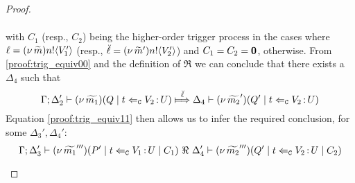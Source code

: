 \begin{proof}
\begin{enumerate}[1.]
\begin{enumerate}
\begin{eqnarray}
							\label{proof:trig_equiv11}
						\end{eqnarray}
							with $C_1$ (resp., $C_2$) being the higher-order trigger process
							in the cases where $\ell = (\nu\, \widetilde{m}) n ! \langle V_1' \rangle$ (resp., $\breve{\ell} = (\nu\, \widetilde{m}') n ! \langle V_2' \rangle$)
							and $C_1 = C_2 = \mathbf{0}$, otherwise.
							From \eqref{proof:trig_equiv00} and the definition of $\Re$
							we can conclude that there exists a $ \Delta_4$ such that
						\[
							\horel{\Gamma}{\Delta_2'}{\newsp{\widetilde{m_1}}{Q \Par \ftrigger{t}{V_2}{U}}}
							{\Hby{\mact{\ell}}}
							{\Delta_4}{\newsp{\widetilde{m_2}'}{Q' \Par \ftrigger{t}{V_2}{U}}}
						\]
							Equation \eqref{proof:trig_equiv11} then allows us to infer the required conclusion, for some $\Delta_3', \Delta_4'$:
						\[
							\Gamma; \Delta_3' \vdash (\nu\, \widetilde{m_1}''')(P' \;|\; t \Leftarrow_{\mathtt{C}} V_1{\,:\,}U \;|\; C_1) \ \Re\  \Delta_4' \vdash (\nu\, \widetilde{m_2}''')(Q' \;|\; t \Leftarrow_{\mathtt{C}} V_2{\,:\,}U \;|\; C_2)
						\]


\end{enumerate}
\end{enumerate}
\end{proof}
